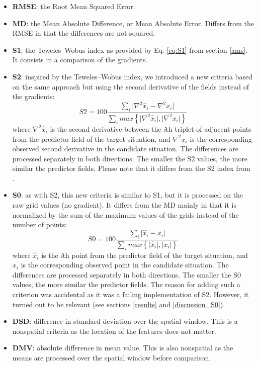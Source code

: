 \documentclass[draft]{agujournal2019}
\begin{document}
\begin{itemize}
	\item \textbf{RMSE}: the Root Mean Squared Error.
	\item \textbf{MD}: the Mean Absolute Difference, or Mean Absolute Error. Differs from the RMSE in that the differences are not squared.
	\item \textbf{S1}: the Teweles--Wobus index as provided by Eq. \ref{eq:S1} from section \ref{ams}. It consists in a comparison of the gradients. 
	\item \textbf{S2}: inspired by the Teweles--Wobus index, we introduced a new criteria based on the same approach but using the second derivative of the fields instead of the gradients:
	\begin{equation}
		\label{eq:S2}
		S2=100 \frac {\displaystyle \sum_{i} \vert \nabla^{2}\hat{x}_{i} - \nabla^{2} x_{i} \vert}
		{\displaystyle \sum_{i} max\left\lbrace \vert \nabla^{2}\hat{x}_{i} \vert , \vert \nabla^{2} x_{i} \vert \right\rbrace }
	\end{equation}
	where $\nabla^{2} \hat{x}_{i}$ is the second derivative between the \textit{i}th triplet of adjacent points from the predictor field of the target situation, and $\nabla^{2} x_{i}$ is the corresponding observed second derivative in the candidate situation. The differences are processed separately in both directions. The smaller the S2 values, the more similar the predictor fields. Please note that it differs from the S2 index from .
	\item \textbf{S0}: as with S2, this new criteria is similar to S1, but it is processed on the raw grid values (no gradient). It differs from the MD mainly in that it is normalized by the sum of the maximum values of the grids instead of the number of points:
	\begin{equation}
		\label{eq:S0}
		S0=100 \frac {\displaystyle \sum_{i} \vert \hat{x}_{i} - x_{i} \vert}
		{\displaystyle \sum_{i} max\left\lbrace \vert \hat{x}_{i} \vert , \vert x_{i} \vert \right\rbrace }
	\end{equation}
	where $\hat{x}_{i}$ is the \textit{i}th point from the predictor field of the target situation, and $x_{i}$ is the corresponding observed point in the candidate situation. The differences are processed separately in both directions. The smaller the S0 values, the more similar the predictor fields. The reason for adding such a criterion was accidental as it was a failing implementation of S2. However, it turned out to be relevant (see sections \ref{results} and \ref{discussion_S0}).
	\item \textbf{DSD}: difference in standard deviation over the spatial window. This is a nonspatial criteria as the location of the features does not matter.
	\item \textbf{DMV}: absolute difference in mean value. This is also nonspatial as the means are processed over the spatial window before comparison.
\end{itemize}
\end{document}
